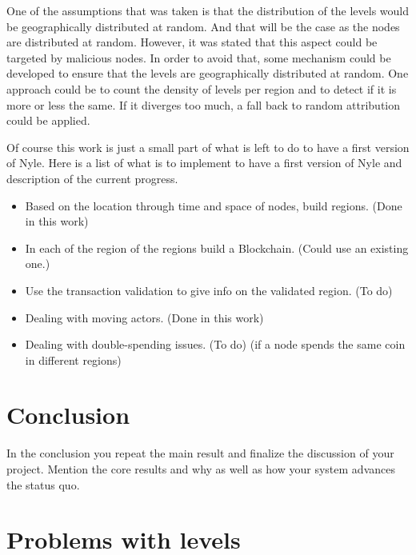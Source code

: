 \documentclass[a4paper,11pt,oneside]{report}
\begin{document}
One of the assumptions that was taken is that the distribution of the levels would be geographically distributed at random. And that will be the case as the nodes are distributed at random. However, it was stated that this aspect could be targeted by malicious nodes. In order to avoid that, some mechanism could be developed to ensure that the levels are geographically distributed at random. One approach could be to count the density of levels per region and to detect if it is more or less the same. If it diverges too much, a fall back to random attribution could be applied. 

Of course this work is just a small part of what is left to do to have a first
version of Nyle. Here is a list of what is to implement to have a first version
of Nyle and description of the current progress.

\begin{itemize} 
\item Based on the location through time and space of nodes, build regions.
(Done in this work)
\item In each of the region of the regions build a Blockchain. (Could use an
    existing one.)
\item Use the transaction validation to give info on the validated region. (To
do) 
\item Dealing with moving actors. (Done in this work)
\item Dealing with double-spending issues. (To do)
(if a node spends the same coin in different regions) 
\end{itemize}

\chapter{Conclusion} \label{chap:Conclusion}

In the conclusion you repeat the main result and finalize the discussion of
your project. Mention the core results and why as well as how your system
advances the status quo.

\cleardoublepage {} {}
\printbibliography


\appendix

\chapter{Problems with levels}
\end{document}
